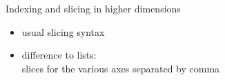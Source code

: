 \documentclass[svgnames]{beamer}
\begin{document}
\begin{frame}{Indexing and slicing in higher dimensions}
 \begin{itemize}
  \item usual slicing syntax
  \item difference to lists:\\
        slices for the various axes separated by comma
 \end{itemize}

 \begin{center}
 \end{center}
\end{frame}
\end{document}
